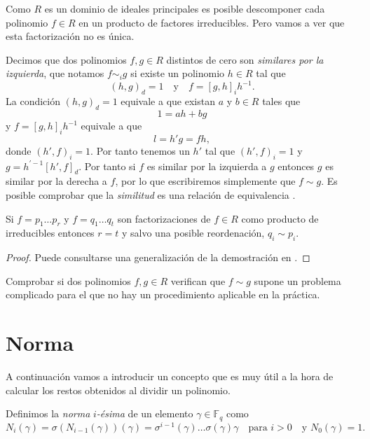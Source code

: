 Como \(R\) es un dominio de ideales principales es posible descomponer cada polinomio \(f \in R\) en un producto de factores irreducibles.
Pero vamos a ver que esta factorización no es única.

Decimos que dos polinomios \(f, g \in R\) distintos de cero son \emph{similares por la izquierda}, que notamos \(f \sim_i g\) si existe un polinomio \(h \in R\) tal que 
\[
  (h, g)_d = 1 \quad\text{y}\quad f = [g, h]_ih^{-1}.
\]
La condición \((h, g)_d = 1\) equivale a que existan \(a\) y \(b \in R\) tales que
\[
  1 = ah + bg
\]
y \(f =  [g, h]_ih^{-1}\) equivale a que 
\[
  l = h'g = fh,
\]
donde \((h', f)_i = 1\).
Por tanto tenemos un \(h'\) tal que \((h', f)_i = 1\) y \(g = h^{'-1}[h', f]_d\).
Por tanto si \(f\) es similar por la izquierda a \(g\) entonces \(g\) es similar por la derecha a \(f\), por lo que escribiremos simplemente que \(f \sim g\).
Es posible comprobar que la \emph{similitud} es una relación de equivalencia \parencite[ver][p. 11]{jacobson_finite-dimensional_1996}.


\begin{theorem}
  Si \(f = p_1 \dots p_r\) y \(f = q_1 \dots q_t\) son factorizaciones de \(f \in R\) como producto de irreducibles entonces \(r= t\) y salvo una posible reordenación, \(q_i \sim p_i\).
\end{theorem}

\begin{proof}
  Puede consultarse una generalización de la demostración en \parencite[Teorema 1.2.9]{jacobson_finite-dimensional_1996}.
\end{proof}

Comprobar si dos polinomios \(f, g \in R\) verifican que \(f \sim g\) supone un problema complicado para el que no hay un procedimiento aplicable en la práctica.

\section{Norma}

A continuación vamos a introducir un concepto que es muy útil a la hora de calcular los restos obtenidos al dividir un polinomio.

Definimos la \emph{norma} \(i\)\emph{-ésima} de un elemento \(\gamma \in \mathbb F_q\) como
\[
  N_i(\gamma) = \sigma(N_{i-1}(\gamma))(\gamma) = \sigma^{i-1}(\gamma)\dots \sigma(\gamma)\gamma \quad\text{para } i > 0 \quad\text{y } N_0(\gamma) = 1.
\]

